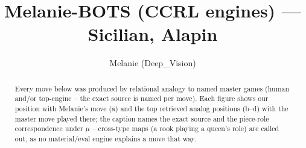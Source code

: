 \documentclass[11pt]{article}
\title{Melanie-BOTS (CCRL engines) — Sicilian, Alapin}
\author{Melanie (Deep\_Vision)}
\date{}
\begin{document}
\maketitle

\begin{abstract}Every move below was produced by relational analogy to named master games (human and/or top-engine -- the exact source is named per move). Each figure shows our position with Melanie's move (a) and the top retrieved analog positions (b--d) with the master move played there; the caption names the exact source and the piece-role correspondence under $\mu$ -- cross-type maps (a rook playing a queen's role) are called out, as no material/eval engine explains a move that way.\end{abstract}

\begin{figure}[p]\centering
\begin{subfigure}{0.46\textwidth}\centering
\resizebox{\linewidth}{!}{%
\newchessgame
\chessboard[
  setfen={r1bqkb1r/pp2pppp/2np4/3nP3/3P4/5N2/PP3PPP/RNBQKB1R w KQkq - 0 7},
  showmover=false,
  pgfstyle=straightmove, color=movearrow, markmove={h2-h4}
]}
\caption{}
\end{subfigure}\hfill
\begin{subfigure}{0.46\textwidth}\centering
\resizebox{\linewidth}{!}{%
\newchessgame
\chessboard[
  setfen={r1bqkb1r/ppp1pppp/2np4/3nP3/3P4/5N2/PPP2PPP/RNBQKB1R w KQkq - 2 5},
  showmover=false,
  pgfstyle=straightmove, color=movearrow, markmove={c2-c4}
]}
\caption{}
\end{subfigure}
\\[4pt]
\begin{subfigure}{0.46\textwidth}\centering
\resizebox{\linewidth}{!}{%
\newchessgame
\chessboard[
  setfen={r1bqkb1r/ppp1pppp/2np4/3nP3/3P4/5N2/PPP2PPP/RNBQKB1R w KQkq - 2 5},
  showmover=false,
  pgfstyle=straightmove, color=movearrow, markmove={c2-c4}
]}
\caption{}
\end{subfigure}\hfill
\begin{subfigure}{0.46\textwidth}\centering
\resizebox{\linewidth}{!}{%
\newchessgame
\chessboard[
  setfen={r1bqkb1r/ppp1pppp/2np4/3nP3/3P4/5N2/PPP2PPP/RNBQKB1R w KQkq - 2 5},
  showmover=false,
  pgfstyle=straightmove, color=movearrow, markmove={c2-c4}
]}
\caption{}
\end{subfigure}

\end{figure}
\end{document}
